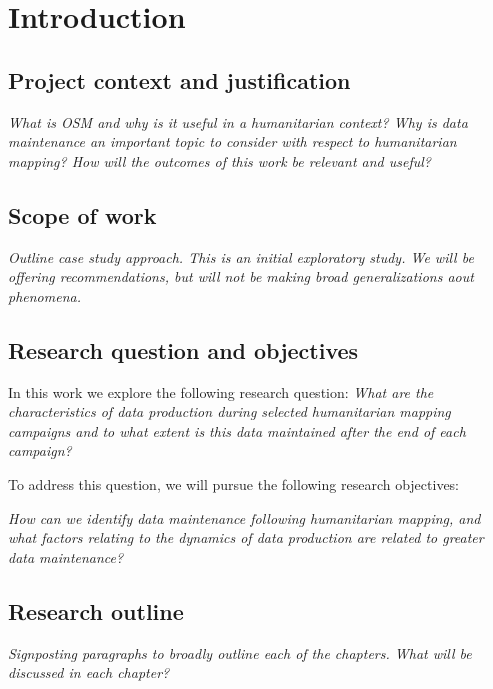 \chapter{Introduction}
\label{chapterlabel1}

\section{Project context and justification}

\textit{What is OSM and why is it useful in a humanitarian context? Why is data maintenance an important topic to consider with respect to humanitarian mapping? How will the outcomes of this work be relevant and useful?}

\section{Scope of work}

\textit{Outline case study approach. This is an initial exploratory study. We will be offering recommendations, but will not be making broad generalizations aout phenomena.}

\section{Research question and objectives}

In this work we explore the following research question: \textit{What are the characteristics of data production during selected humanitarian mapping campaigns and to what extent is this data maintained after the end of each campaign?}

To address this question, we will pursue the following research objectives: 

\textit{How can we identify data maintenance following humanitarian mapping, and what factors relating to the dynamics of data production are related to greater data maintenance?}

\section{Research outline}

\textit{Signposting paragraphs to broadly outline each of the chapters. What will be discussed in each chapter?}

